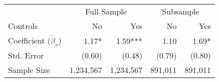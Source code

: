 \documentclass{standalone}
\begin{document}
\begin{tabular}{lrrrr}
\toprule 
\midrule 
  & \multicolumn{2}{c}{Full Sample} & \multicolumn{2}{c}{Subsample} \\
 \cmidrule(lr){2-3} \cmidrule(lr){4-5} 
Controls & No & Yes & No & Yes \\[1.000000pt]
\midrule 
Coefficient ($\tilde{\beta}_\nu$) & 1.17* & 1.59*** & 1.10 & 1.69* \\
Std. Error & (0.60) & (0.48) & (0.79) & (0.80) \\
\midrule 
Sample Size & 1,234,567 & 1,234,567 & 891,011 & 891,011 \\
\midrule 
\bottomrule 
\end{tabular}
\end{document}
